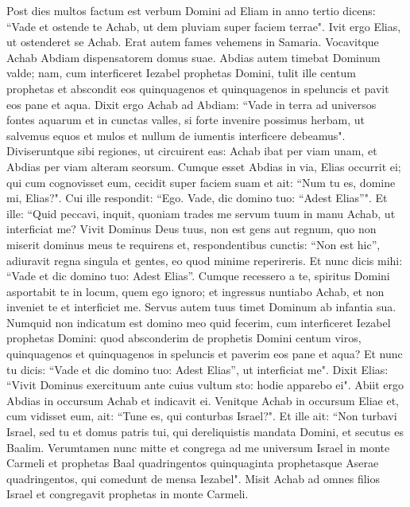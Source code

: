 \begin{biblechapter}  
\verse Post dies multos factum est verbum Domini ad Eliam in anno tertio dicens: “Vade et ostende te Achab, ut dem pluviam super faciem terrae". 
\verse Ivit ergo Elias, ut ostenderet se Achab. Erat autem fames vehemens in Samaria. 
\verse Vocavitque Achab Abdiam dispensatorem domus suae. Abdias autem timebat Dominum valde; 
\verse nam, cum interficeret Iezabel prophetas Domini, tulit ille centum prophetas et abscondit eos quinquagenos et quinquagenos in speluncis et pavit eos pane et aqua. 
\verse Dixit ergo Achab ad Abdiam: “Vade in terra ad universos fontes aquarum et in cunctas valles, si forte invenire possimus herbam, ut salvemus equos et mulos et nullum de iumentis interficere debeamus". 
\verse Diviseruntque sibi regiones, ut circuirent eas: Achab ibat per viam unam, et Abdias per viam alteram seorsum. 
\verse Cumque esset Abdias in via, Elias occurrit ei; qui cum cognovisset eum, cecidit super faciem suam et ait: “Num tu es, domine mi, Elias?". 
\verse Cui ille respondit: “Ego. Vade, dic domino tuo: “Adest Elias”". 
\verse Et ille: “Quid peccavi, inquit, quoniam trades me servum tuum in manu Achab, ut interficiat me? 
\verse Vivit Dominus Deus tuus, non est gens aut regnum, quo non miserit dominus meus te requirens et, respondentibus cunctis: “Non est hic”, adiuravit regna singula et gentes, eo quod minime reperireris. 
\verse Et nunc dicis mihi: “Vade et dic domino tuo: Adest Elias”. 
\verse Cumque recessero a te, spiritus Domini asportabit te in locum, quem ego ignoro; et ingressus nuntiabo Achab, et non inveniet te et interficiet me. Servus autem tuus timet Dominum ab infantia sua. 
\verse Numquid non indicatum est domino meo quid fecerim, cum interficeret Iezabel prophetas Domini: quod absconderim de prophetis Domini centum viros, quinquagenos et quinquagenos in speluncis et paverim eos pane et aqua? 
\verse Et nunc tu dicis: “Vade et dic domino tuo: Adest Elias”, ut interficiat me". 
\verse Dixit Elias: “Vivit Dominus exercituum ante cuius vultum sto: hodie apparebo ei". 
\verse Abiit ergo Abdias in occursum Achab et indicavit ei. Venitque Achab in occursum Eliae 
\verse et, cum vidisset eum, ait: “Tune es, qui conturbas Israel?". 
\verse Et ille ait: “Non turbavi Israel, sed tu et domus patris tui, qui dereliquistis mandata Domini, et secutus es Baalim. 
\verse Verumtamen nunc mitte et congrega ad me universum Israel in monte Carmeli et prophetas Baal quadringentos quinquaginta prophetasque Aserae quadringentos, qui comedunt de mensa Iezabel". 
\verse Misit Achab ad omnes filios Israel et congregavit prophetas in monte Carmeli. 

\end{biblechapter}
